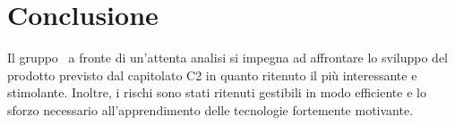 \documentclass[../StudioDiFattibilita.tex]{subfiles}
\begin{document}
\section{Conclusione}
Il gruppo \leaf\ a fronte di un'attenta analisi si impegna ad affrontare lo sviluppo del prodotto previsto dal capitolato C2 in quanto ritenuto il più interessante e stimolante. Inoltre, i rischi sono stati ritenuti gestibili in modo efficiente e lo sforzo necessario all'apprendimento delle tecnologie fortemente motivante.
\end{document}
